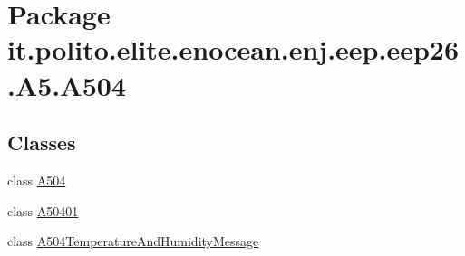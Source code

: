 \hypertarget{namespaceit_1_1polito_1_1elite_1_1enocean_1_1enj_1_1eep_1_1eep26_1_1_a5_1_1_a504}{}\section{Package it.\+polito.\+elite.\+enocean.\+enj.\+eep.\+eep26.\+A5.\+A504}
\label{namespaceit_1_1polito_1_1elite_1_1enocean_1_1enj_1_1eep_1_1eep26_1_1_a5_1_1_a504}
\subsection*{Classes}
\begin{DoxyCompactItemize}
\item 
class \hyperlink{classit_1_1polito_1_1elite_1_1enocean_1_1enj_1_1eep_1_1eep26_1_1_a5_1_1_a504_1_1_a504}{A504}
\item 
class \hyperlink{classit_1_1polito_1_1elite_1_1enocean_1_1enj_1_1eep_1_1eep26_1_1_a5_1_1_a504_1_1_a50401}{A50401}
\item 
class \hyperlink{classit_1_1polito_1_1elite_1_1enocean_1_1enj_1_1eep_1_1eep26_1_1_a5_1_1_a504_1_1_a504_temperature_and_humidity_message}{A504\+Temperature\+And\+Humidity\+Message}
\end{DoxyCompactItemize}
